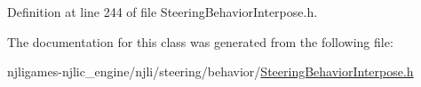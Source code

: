 Definition at line 244 of file Steering\+Behavior\+Interpose.\+h.



The documentation for this class was generated from the following file\+:\begin{DoxyCompactItemize}
\item 
njligames-\/njlic\+\_\+engine/njli/steering/behavior/\mbox{\hyperlink{_steering_behavior_interpose_8h}{Steering\+Behavior\+Interpose.\+h}}\end{DoxyCompactItemize}
